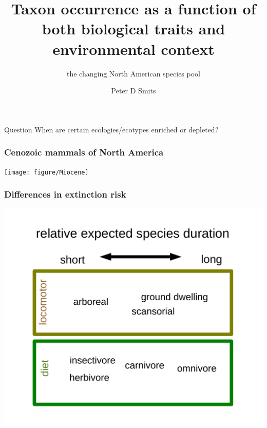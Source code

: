 \documentclass{beamer}
\title{Taxon occurrence as a function of both biological traits and environmental context}
\subtitle{the changing North American species pool}
\author{Peter D Smits}
\institute{Committee on Evolutionary Biology, University of Chicago}
\date{}
\begin{document}
\begin{frame}
  \maketitle
\end{frame}


\begin{frame}
  \begin{alertblock}{Question}
    When are certain ecologies/ecotypes enriched or depleted?
  \end{alertblock}
\end{frame}


\begin{frame}
  \frametitle{Cenozoic mammals of North America}
  \begin{center}
    \texttt{[image: figure/Miocene]}
  \end{center}

\end{frame}


\begin{frame}
  \frametitle{Differences in extinction risk}

  \begin{center}
    \includegraphics[height=0.8\textheight,width=\textwidth,keepaspectratio=true]{figure/smits_2015_results}
  \end{center}

\end{frame}
\end{document}
